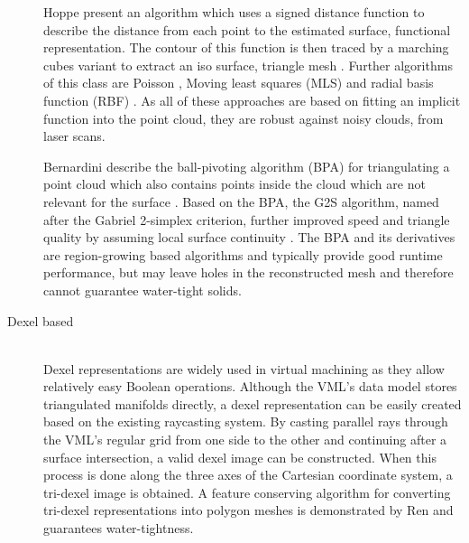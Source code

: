 \begin{description}
	Hoppe \etal present an algorithm which uses a signed distance function to describe the distance from each point to the estimated surface, \ie functional representation.
	The contour of this function is then traced by a marching cubes variant to extract an iso surface, \ie triangle mesh \cite{sdf_surface_reconstruction}.
	Further algorithms of this class are Poisson \cite{poisson}, Moving least squares (MLS) \cite{mls} and radial basis function (RBF) \cite{rbf}.
	As all of these approaches are based on fitting an implicit function into the point cloud, they are robust against noisy clouds, \eg from laser scans.
	
	Bernardini \etal describe the ball-pivoting algorithm (BPA) for triangulating a point cloud which also contains points inside the cloud which are not relevant for the surface \cite{bpa}.
	Based on the BPA, the G2S algorithm, named after the Gabriel 2-simplex criterion, further improved speed and triangle quality by assuming local surface continuity \cite{g2s}.
	The BPA and its derivatives are region-growing based algorithms and typically provide good runtime performance, but may leave holes in the reconstructed mesh and therefore cannot guarantee water-tight solids.
		
	\item[Dexel based] \hfill \\
	Dexel representations are widely used in virtual machining as they allow  relatively easy Boolean operations.
	Although the VML's data model stores triangulated manifolds directly, a dexel representation can be easily created based on the existing raycasting system.
	By casting parallel rays through the VML's regular grid from one side to the other and continuing after a surface intersection, a valid dexel image can be constructed.
	When this process is done along the three axes of the Cartesian coordinate system, a tri-dexel image is obtained.
	A feature conserving algorithm for converting tri-dexel representations into polygon meshes is demonstrated by Ren \etal \cite{tridexel_reconstruction} and guarantees water-tightness.
	

\end{description}
